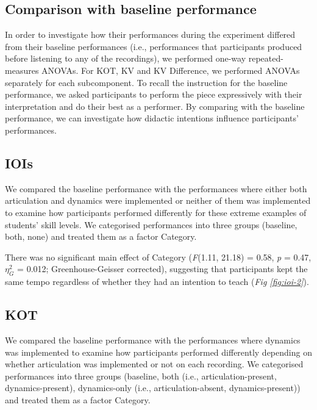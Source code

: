 \documentclass[
  man]{apa6}
\begin{document}
\hypertarget{comparison-with-baseline-performance}{%
\subsection{Comparison with baseline performance}\label{comparison-with-baseline-performance}}

In order to investigate how their performances during the experiment differed from their baseline performances (i.e., performances that participants produced before listening to any of the recordings), we performed one-way repeated-measures ANOVAs. For KOT, KV and KV Difference, we performed ANOVAs separately for each subcomponent. To recall the instruction for the baseline performance, we asked participants to perform the piece expressively with their interpretation and do their best as a performer. By comparing with the baseline performance, we can investigate how didactic intentions influence participants' performances.

\hypertarget{iois-1}{%
\subsection{IOIs}\label{iois-1}}

We compared the baseline performance with the performances where either both articulation and dynamics were implemented or neither of them was implemented to examine how participants performed differently for these extreme examples of students' skill levels. We categorised performances into three groups (baseline, both, none) and treated them as a factor Category.

There was no significant main effect of Category (\emph{F}(1.11, 21.18) = 0.58, \emph{p} = 0.47, \(\eta_G^2\) = 0.012; Greenhouse-Geisser corrected), suggesting that participants kept the same tempo regardless of whether they had an intention to teach (\emph{Fig \ref{fig:ioi-2}}).

\hypertarget{kot-1}{%
\subsection{KOT}\label{kot-1}}

We compared the baseline performance with the performances where dynamics was implemented to examine how participants performed differently depending on whether articulation was implemented or not on each recording. We categorised performances into three groups (baseline, both (i.e., articulation-present, dynamics-present), dynamics-only (i.e., articulation-absent, dynamics-present)) and treated them as a factor Category.
\end{document}

